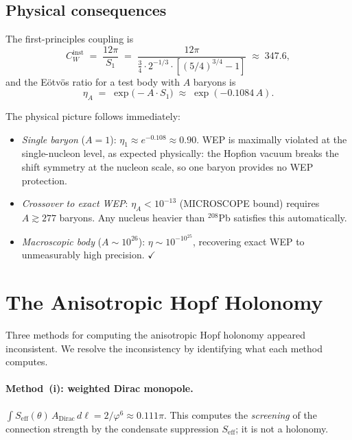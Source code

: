 \documentclass[11pt,a4paper]{article}
\theoremstyle{definition}
\theoremstyle{remark}
\newcommand{\vp}{\varphi}
\begin{document}
\subsection{Physical consequences}

The first-principles coupling is
\begin{equation}
  C_W^{\mathrm{inst}}
  \;=\; \frac{12\pi}{S_1}
  \;=\; \frac{12\pi}{\tfrac{3}{4}\cdot2^{-1/3}\cdot[(5/4)^{3/4}-1]}
  \;\approx\; 347.6,
  \label{P5:eq:CW_inst_FP}
\end{equation}
and the E\"{o}tv\"{o}s ratio for a test body with $A$ baryons is
\begin{equation}
  \boxed{\eta_A \;=\; \exp\!\bigl(-A\cdot S_1\bigr)
         \;\approx\; \exp(-0.1084\,A).}
  \label{P5:eq:eta_A_FP}
\end{equation}

The physical picture follows immediately:
\begin{itemize}[noitemsep]
\item \emph{Single baryon} ($A=1$): $\eta_1\approx e^{-0.108}\approx0.90$.
  WEP is maximally violated at the single-nucleon level, as expected
  physically: the Hopfion vacuum breaks the shift symmetry at the
  nucleon scale, so one baryon provides no WEP protection.
\item \emph{Crossover to exact WEP}: $\eta_A < 10^{-13}$ (MICROSCOPE bound)
  requires $A\gtrsim277$ baryons.  Any nucleus heavier than
  ${}^{208}$Pb satisfies this automatically.
\item \emph{Macroscopic body} ($A\sim10^{26}$):
  $\eta\sim 10^{-10^{25}}$, recovering exact WEP to unmeasurably
  high precision. $\checkmark$
\end{itemize}

\section{The Anisotropic Hopf Holonomy}
\label{P5:sec:holonomy}

Three methods for computing the anisotropic Hopf holonomy appeared
inconsistent.  We resolve the inconsistency by identifying what each
method computes.

\paragraph{Method~(i): weighted Dirac monopole.}
$\int S_{\mathrm{eff}}(\theta)\,A_{\mathrm{Dirac}}\,d\ell
= 2/\vp^6\approx0.111\pi$.
This computes the \emph{screening} of the connection strength by the
condensate suppression $S_{\mathrm{eff}}$; it is not a holonomy.
\end{document}
